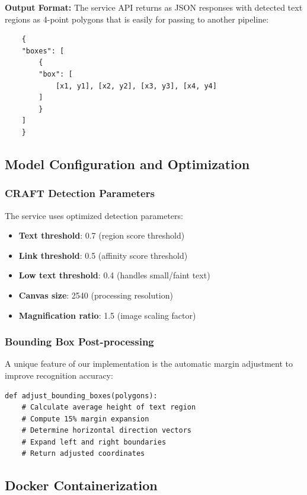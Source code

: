 {\textbf{Output Format:}
The service API returns as JSON responses with detected text regions as 4-point polygons that is easily for passing to another pipeline:

    \begin{verbatim}
    {
    "boxes": [
        {
        "box": [
            [x1, y1], [x2, y2], [x3, y3], [x4, y4]
        ]
        }
    ]
    }
    \end{verbatim}

\subsection{Model Configuration and Optimization}
\label{subsec:craft-config}

\subsubsection*{CRAFT Detection Parameters}

The service uses optimized detection parameters:
\begin{itemize}
\item \textbf{Text threshold}: 0.7 (region score threshold)
\item \textbf{Link threshold}: 0.5 (affinity score threshold)
\item \textbf{Low text threshold}: 0.4 (handles small/faint text)
\item \textbf{Canvas size}: 2540 (processing resolution)
\item \textbf{Magnification ratio}: 1.5 (image scaling factor)
\end{itemize}

\subsubsection*{Bounding Box Post-processing}

A unique feature of our implementation is the automatic margin adjustment to improve recognition accuracy:

\begin{verbatim}
def adjust_bounding_boxes(polygons):
    # Calculate average height of text region
    # Compute 15% margin expansion
    # Determine horizontal direction vectors
    # Expand left and right boundaries
    # Return adjusted coordinates
\end{verbatim}

\subsection{Docker Containerization}
\label{subsec:craft-docker}

}
